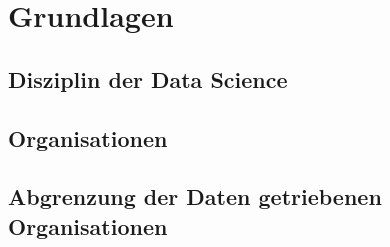 \chapter[Grundlagen]{Grundlagen}

\section{Disziplin der Data Science}

\section{Organisationen}

\section{Abgrenzung der Daten getriebenen Organisationen}